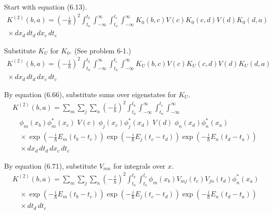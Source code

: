 


Start with equation (6.13).
\begin{multline*}
K^{(2)}(b,a)=\left(-\frac{i}{\hbar}\right)^2
\int_{t_a}^{t_b}
\int_{-\infty}^\infty
\int_{t_a}^{t_c}
\int_{-\infty}^\infty
K_0(b,c)V(c)K_0(c,d)V(d)K_0(d,a)
\\
{}\times dx_d\,dt_d\,dx_c\,dt_c
\end{multline*}

Substitute $K_U$ for $K_0$.
(See problem 6-1.)
\begin{multline*}
K^{(2)}(b,a)=\left(-\frac{i}{\hbar}\right)^2
\int_{t_a}^{t_b}
\int_{-\infty}^\infty
\int_{t_a}^{t_c}
\int_{-\infty}^\infty
K_U(b,c)V(c)K_U(c,d)V(d)K_U(d,a)
\\
{}\times dx_d\,dt_d\,dx_c\,dt_c
\end{multline*}

By equation (6.66), substitute sums over eigenstates for $K_U$.
\begin{align*}
&K^{(2)}(b,a)=\sum_m\sum_j\sum_n
\left(-\frac{i}{\hbar}\right)^2
\int_{t_a}^{t_b}
\int_{-\infty}^\infty
\int_{t_a}^{t_c}
\int_{-\infty}^\infty
\\
&\quad\phi_m(x_b)\phi_m^*(x_c)\;V(c)\;\phi_j(x_c)\phi_j^*(x_d)\;V(d)\;\phi_n(x_d)\phi_n^*(x_a)
\\
&\quad\times
\exp\left(-\frac{i}{\hbar}E_m(t_b-t_c)\right)
\exp\left(-\frac{i}{\hbar}E_j(t_c-t_d)\right)
\exp\left(-\frac{i}{\hbar}E_n(t_d-t_a)\right)
\\
&\quad{}\times dx_d\,dt_d\,dx_c\,dt_c
\end{align*}

By equation (6.71), substitute $V_{mn}$ for integrals over $x$.
\begin{align*}
&K^{(2)}(b,a)=\sum_m\sum_j\sum_n
\left(-\frac{i}{\hbar}\right)^2
\int_{t_a}^{t_b}
\int_{t_a}^{t_c}
\phi_m(x_b)V_{mj}(t_c)V_{jn}(t_d)\phi_n^*(x_a)
\\
&\quad\times
\exp\left(-\frac{i}{\hbar}E_m(t_b-t_c)\right)
\exp\left(-\frac{i}{\hbar}E_j(t_c-t_d)\right)
\exp\left(-\frac{i}{\hbar}E_n(t_d-t_a)\right)
\\
&\quad{}\times dt_d\,dt_c
\end{align*}


